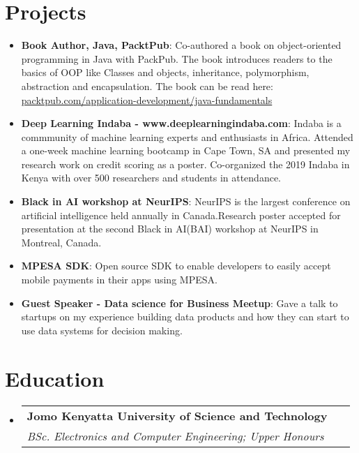 \documentclass[letterpaper,11pt]{article}
\makeatletter
\newcommand{\resumeItem}[2]{
  \item\small{
    \textbf{#1}{: #2 \vspace{-2pt}}
  }
}
\newcommand{\resumeSubheading}[4]{
  \vspace{-1pt}\item
    \begin{tabular*}{0.97\textwidth}{l@{\extracolsep{\fill}}r}
      \textbf{#1} & #2 \\
      \textit{\small#3} & \textit{\small #4} \\
    \end{tabular*}\vspace{-5pt}
}
\newcommand{\resumeSubItem}[2]{\resumeItem{#1}{#2}\vspace{-4pt}}
\newcommand{\resumeSubHeadingListStart}{\begin{itemize}[leftmargin=*]}
\newcommand{\resumeSubHeadingListEnd}{\end{itemize}}
\makeatother
\begin{document}
\section{Projects}
  \resumeSubHeadingListStart
	\resumeSubItem{Book Author, Java, PacktPub}
      {Co-authored a book on object-oriented programming in Java with PackPub. The book introduces readers to the basics of OOP like Classes and objects, inheritance, polymorphism, abstraction and encapsulation. The book can be read here:\href{https://www.packtpub.com/application-development/java-fundamentals}{ packtpub.com/application-development/java-fundamentals}}  	
  	\resumeSubItem{Deep Learning Indaba - www.deeplearningindaba.com}
      {Indaba is a commmunity of machine learning experts and enthusiasts in Africa. Attended a one-week machine learning bootcamp in Cape Town, SA and presented my research work on credit scoring as a poster. Co-organized the 2019 Indaba in Kenya with over 500 researchers and students in attendance.}
  	\resumeSubItem{Black in AI workshop at NeurIPS}
      {NeurIPS is the largest conference on artificial intelligence held annually in Canada.Research poster accepted for presentation at the second Black in AI(BAI) workshop at NeurIPS in Montreal, Canada.}
    \resumeSubItem{MPESA SDK}
      {Open source SDK to enable developers to easily accept mobile payments in their apps using MPESA.}
    \resumeSubItem{Guest Speaker - Data science for Business Meetup}
      {Gave a talk to startups on my experience building data products and how they can start to use data systems for decision making.}
  \resumeSubHeadingListEnd

\section{Education}
  \resumeSubHeadingListStart
    \resumeSubheading
      {Jomo Kenyatta University of Science and Technology}{}
      {BSc. Electronics and Computer Engineering; Upper Honours}
      \
  \resumeSubHeadingListEnd





\end{document}
